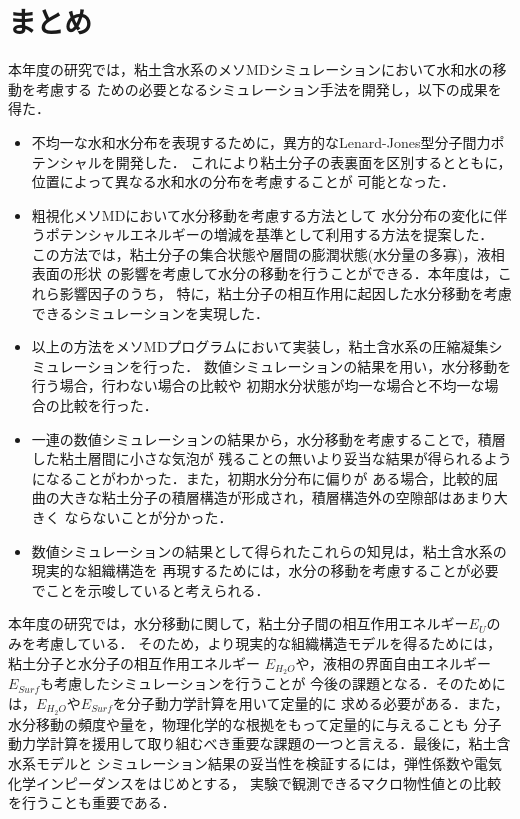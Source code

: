 ﻿\documentclass[11pt,a4j]{jarticle}
\begin{document}
\section{まとめ}
本年度の研究では，粘土含水系のメソMDシミュレーションにおいて水和水の移動を考慮する
ための必要となるシミュレーション手法を開発し，以下の成果を得た．
\begin{itemize}
\item
不均一な水和水分布を表現するために，異方的なLenard-Jones型分子間力ポテンシャルを開発した．
これにより粘土分子の表裏面を区別するとともに，位置によって異なる水和水の分布を考慮することが
可能となった．
\item
粗視化メソMDにおいて水分移動を考慮する方法として
水分分布の変化に伴うポテンシャルエネルギーの増減を基準として利用する方法を提案した．
この方法では，粘土分子の集合状態や層間の膨潤状態(水分量の多寡)，液相表面の形状
の影響を考慮して水分の移動を行うことができる．本年度は，これら影響因子のうち，
特に，粘土分子の相互作用に起因した水分移動を考慮できるシミュレーションを実現した．
\item
以上の方法をメソMDプログラムにおいて実装し，粘土含水系の圧縮凝集シミュレーションを行った．
数値シミュレーションの結果を用い，水分移動を行う場合，行わない場合の比較や
初期水分状態が均一な場合と不均一な場合の比較を行った．
\item
一連の数値シミュレーションの結果から，水分移動を考慮することで，積層した粘土層間に小さな気泡が
残ることの無いより妥当な結果が得られるようになることがわかった．また，初期水分分布に偏りが
ある場合，比較的屈曲の大きな粘土分子の積層構造が形成され，積層構造外の空隙部はあまり大きく
ならないことが分かった．
\item
数値シミュレーションの結果として得られたこれらの知見は，粘土含水系の現実的な組織構造を
再現するためには，水分の移動を考慮することが必要でことを示唆していると考えられる．
\end{itemize}
本年度の研究では，水分移動に関して，粘土分子間の相互作用エネルギー$E_U$のみを考慮している．
そのため，より現実的な組織構造モデルを得るためには，粘土分子と水分子の相互作用エネルギー
$E_{H_2O}$や，液相の界面自由エネルギー$E_{Surf}$も考慮したシミュレーションを行うことが
今後の課題となる．そのためには，$E_{H_2O}$や$E_{Surf}$を分子動力学計算を用いて定量的に
求める必要がある．また，水分移動の頻度や量を，物理化学的な根拠をもって定量的に与えることも
分子動力学計算を援用して取り組むべき重要な課題の一つと言える．最後に，粘土含水系モデルと
シミュレーション結果の妥当性を検証するには，弾性係数や電気化学インピーダンスをはじめとする，
実験で観測できるマクロ物性値との比較を行うことも重要である．
\end{document}
